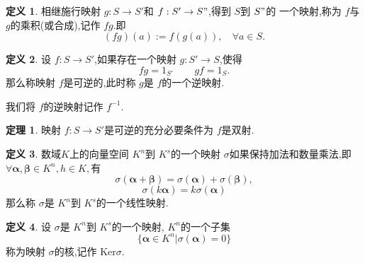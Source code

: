\documentclass[a4paper,11pt]{article}%
\theoremstyle{remark}
\theoremstyle{definition}
\newtheorem{theorem}{定理}[section]
\theoremstyle{definition}
\newtheorem*{definition}{定义}
\theoremstyle{plain}
\begin{document}
\begin{definition}
    相继施行映射 $g:S\rightarrow S'$和 $f:S'\rightarrow S"$,得到 $S$到 $S"$的
    一个映射,称为 $f$与 $g$的乘积(或合成),记作 $fg$.即
    \[(fg)(a):=f(g(a)),\phantom{ss}\forall a \in S.\]
\end{definition}
\begin{definition}
    设 $f:S\rightarrow S'$,如果存在一个映射 $g:S'\rightarrow S$,使得
    \[fg=1_{S'}\phantom{aaaa}gf=1_S.\]
    那么称映射 $f$是可逆的,此时称 $g$是 $f$的一个逆映射.

    我们将 $f$的逆映射记作 $f^{-1}.$
\end{definition}
\begin{theorem}
    映射 $f:S\rightarrow S'$是可逆的充分必要条件为 $f$是双射.
\end{theorem}
\begin{definition}
    数域$K$上的向量空间 $K^n$到 $K^s$的一个映射 $\sigma$如果保持加法和数量乘法,即
    $\forall \bm{\alpha},\bm{\beta}\in K^n,h\in K,$有
    \[\sigma(\bm{\alpha}+\bm{\beta})=\sigma(\bm{\alpha})+\sigma(\bm{\beta}),\]
    \[\sigma(k \bm{\alpha})=k\sigma(\bm{\alpha})\]
    那么称 $\sigma$是 $K^n$到 $K^s$的一个线性映射. 
\end{definition}
\begin{definition}
    设 $\sigma$是 $K^n$到 $K^s$的一个映射, $K^n$的一个子集
    \[\{\bm{\alpha}\in K^n\vert \sigma(\bm{\alpha})=0\}\]
    称为映射 $\sigma$的核,记作 Ker$\sigma$.
\end{definition}
\end{document}
